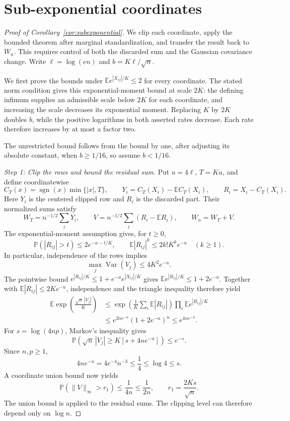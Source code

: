 \documentclass[11pt,letterpaper]{article}
\theoremstyle{remark}
\newcommand{\E}{\mathbb E}
\newcommand{\Pp}{\mathbb P}
\newcommand{\Var}{\operatorname{Var}}
\begin{document}
\section{Sub-exponential coordinates}\label{app:subexponential}
\begin{proof}[Proof of Corollary~\ref{cor:subexponential}]
We clip each coordinate, apply the bounded theorem after marginal
standardization, and transfer the result back to \(W_n\). This requires
control of both the discarded sum and the Gaussian covariance change.
Write \(\ell=\log(en)\) and \(b=K\ell/\sqrt n\).

We first prove the bounds under \(\E e^{|X_{ij}|/K}\le2\) for every
coordinate. The stated norm condition gives this exponential-moment
bound at scale \(2K\): the defining infimum supplies an admissible
scale below \(2K\) for each coordinate, and increasing the scale
decreases its exponential moment. Replacing \(K\) by \(2K\) doubles
\(b\), while the positive logarithms in both asserted rates decrease.
Each rate therefore increases by at most a factor two.

The unrestricted bound follows from the bound by one, after adjusting its absolute
constant, when \(b\ge1/16\), so assume \(b<1/16\).

\emph{Step 1: Clip the rows and bound the residual sum.}
Put \(u=4\ell\), \(T=Ku\), and define coordinatewise
\[
 C_T(x)=\operatorname{sgn}(x)\min\{|x|,T\},\qquad
 Y_i=C_T(X_i)-\E C_T(X_i),\qquad R_i=X_i-C_T(X_i).
\]
Here \(Y_i\) is the centered clipped row and \(R_i\) is the discarded
part. Their normalized sums satisfy
\[
 W_T=n^{-1/2}\sum_iY_i,\qquad
 V=n^{-1/2}\sum_i(R_i-\E R_i),\qquad W_n=W_T+V.
\]
The exponential-moment assumption gives, for \(t\ge0\),
\[
 \Pp(|R_{ij}|>t)\le2e^{-u-t/K},\qquad
 \E|R_{ij}|^k\le2k!K^ke^{-u}\quad(k\ge1).
\]
In particular, independence of the rows implies
\begin{equation}
 \max_j\Var(V_j)\le4K^2e^{-u}.
 \label{tail:residual-moments}
\end{equation}
The pointwise bound \(e^{|R_{ij}|/K}\le1+e^{-u}e^{|X_{ij}|/K}\)
gives \(\E e^{|R_{ij}|/K}\le1+2e^{-u}\). Together with
\(\E|R_{ij}|\le2Ke^{-u}\), independence and the triangle inequality
therefore yield
\begin{align*}
 \E\exp\!\left(\frac{\sqrt n\,|V_j|}{K}\right)
 &\le\exp\!\left(\frac1K\sum_i\E|R_{ij}|\right)
          \prod_i\E e^{|R_{ij}|/K}\\
 &\le e^{2ne^{-u}}(1+2e^{-u})^n
 \le e^{4ne^{-u}}.
\end{align*}
For \(s=\log(4np)\), Markov's inequality gives
\[
 \Pp\!\left(\sqrt n\,|V_j|\ge K[s+4ne^{-u}]\right)\le e^{-s}.
\]
Since \(n,p\ge1\),
\[
 4ne^{-u}=4e^{-4}n^{-3}\le\frac14\le\log4\le s.
\]
A coordinate union bound now yields
\begin{equation}
 \Pp(\|V\|_\infty>r_1)\le\frac1{4n}\le\frac1{2n},\qquad
 r_1=\frac{2Ks}{\sqrt n}.
 \label{tail:sum-coupling}
\end{equation}
The union bound is applied to the residual sums. The clipping level can
therefore depend only on \(\log n\).


\end{proof}
\end{document}
